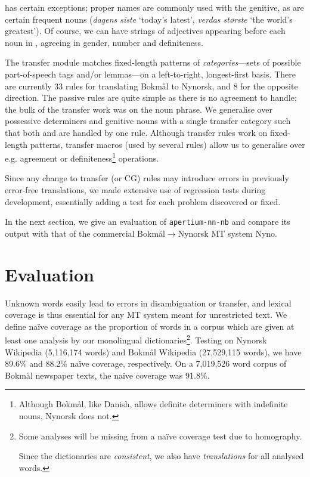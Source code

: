 \documentclass[11pt]{article}
\begin{document}
\Last has certain exceptions; proper names are commonly used with the
genitive, as are certain frequent nouns (\emph{dagens siste} `today's
latest', \emph{verdas største} `the world's greatest'). Of course, we
can have strings of adjectives appearing before each noun in
\Last[a-d], agreeing in gender, number and definiteness. 

The transfer module matches fixed-length patterns of
\emph{categories}—sets of possible part-of-speech tags and/or
lemmas—on a left-to-right, longest-first basis. There are currently 33
rules for translating Bokmål to Nynorsk, and 8 for the opposite
direction. The passive rules are quite simple as there is no agreement
to handle; the bulk of the transfer work was on the noun phrase. We
generalise over possessive determiners and genitive nouns with a
single transfer category such that both \Last[a-b] and \Last[c-d] are
handled by one rule. Although transfer rules work on fixed-length
patterns, transfer macros (used by several rules) allow us to
generalise over e.g. agreement or definiteness\footnote{Although
  Bokmål, like Danish, allows definite determiners with indefinite
  nouns, Nynorsk does not.} operations.

Since any change to transfer (or CG) rules may introduce
errors in previously error-free translations, we made extensive use of
regression tests during development, essentially adding a test for
each problem discovered or fixed.

In the next section, we give an evaluation of {\tt \small  apertium-nn-nb} and
compare its output with that of the commercial
Bokmål$\rightarrow$Nynorsk MT system Nyno.


\section{Evaluation}
\label{sec:eval}

Unknown words easily lead to errors in disambiguation or
transfer, and lexical coverage is thus essential for any MT system meant for
unrestricted text.  We define naïve coverage as the proportion of
words in a corpus which are given at least one analysis by our
monolingual dictionaries\footnote{Some analyses will be missing from a
naïve coverage test due to homography. 

Since the dictionaries are \emph{consistent}, we also have
\emph{translations} for all analysed words.}. Testing on Nynorsk
Wikipedia (5,116,174 words) and Bokmål Wikipedia (27,529,115 words),
we have 89.6\% and 88.2\% naïve coverage, respectively. On a 7,019,526
word corpus of Bokmål newspaper texts, the naïve coverage was 91.8\%.
\end{document}
